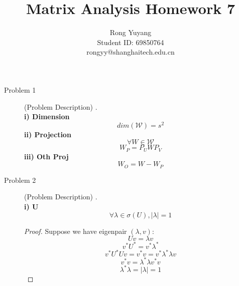 \documentclass{article}
\title{Matrix Analysis Homework 7}
\author{Rong Yuyang \\ Student ID: 69850764 \\ rongyy@shanghaitech.edu.cn}
\begin{document}
\maketitle

\begin{description}
	\item[Problem 1] (Problem Description)
	.\\
	\textbf{i) Dimension}
		$$dim(\mathcal{W}) = s^2$$
	\textbf{ii) Projection}
		$$\forall W \in \mathcal{W}$$
		$$W_P = P_UWP_V$$
	\textbf{iii) Oth Proj}
		$$W_O = W - W_P$$

	\item[Problem 2] (Problem Description)
	.\\
	\textbf{i) U}
	$$\forall \lambda \in \sigma(U), |\lambda| = 1$$
	\begin{proof}
		Suppose we have eigenpair $(\lambda, v)$:
		$$ Uv = \lambda v$$
		$$ v^*U^* = v^*\lambda^*$$
		$$ v^*U^* Uv = v^*v = v^*\lambda^*\lambda v$$
		$$ v^*v = \lambda^*\lambda v^*v$$
		$$ \lambda^*\lambda = |\lambda| = 1$$
	\end{proof}

\end{description}
\end{document}
